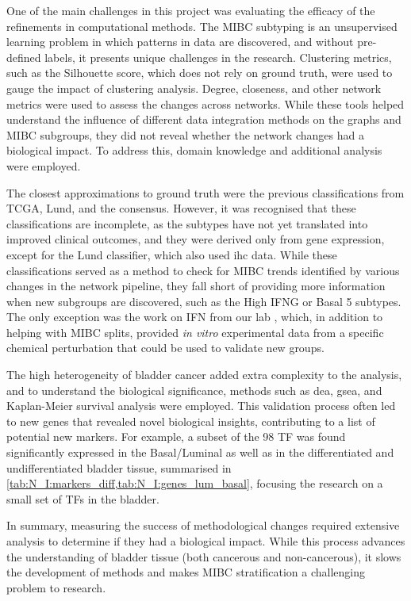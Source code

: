 One of the main challenges in this project was evaluating the efficacy of the refinements in computational methods. The MIBC subtyping is an unsupervised learning problem in which patterns in data are discovered, and without pre-defined labels, it presents unique challenges in the research. Clustering metrics, such as the Silhouette score, which does not rely on ground truth, were used to gauge the impact of clustering analysis. Degree, closeness, and other network metrics were used to assess the changes across networks. While these tools helped understand the influence of different data integration methods on the graphs and MIBC subgroups, they did not reveal whether the network changes had a biological impact. To address this, domain knowledge and additional analysis were employed.

The closest approximations to ground truth were the previous classifications from TCGA, Lund, and the consensus. However, it was recognised that these classifications are incomplete, as the subtypes have not yet translated into improved clinical outcomes, and they were derived only from gene expression, except for the Lund classifier, which also used \acrlong{ihc} data. While these classifications served as a method to check for MIBC trends identified by various changes in the network pipeline, they fall short of providing more information when new subgroups are discovered, such as the High IFNG or Basal 5 subtypes. The only exception was the work on \gls{IFN} from our lab \citep{Baker2022-bj}, which, in addition to helping with MIBC splits, provided \textit{in vitro} experimental data from a specific chemical perturbation that could be used to validate new groups.

The high heterogeneity of bladder cancer added extra complexity to the analysis, and to understand the biological significance, methods such as \acrlong{dea}, \acrlong{gsea}, and Kaplan-Meier survival analysis were employed. This validation process often led to new genes that revealed novel biological insights, contributing to a list of potential new markers. For example, a subset of the 98 TF was found significantly expressed in the Basal/Luminal as well as in the differentiated and undifferentiated bladder tissue, summarised in \cref{tab:N_I:markers_diff,tab:N_I:genes_lum_basal}, focusing the research on a small set of TFs in the bladder.


In summary, measuring the success of methodological changes required extensive analysis to determine if they had a biological impact. While this process advances the understanding of bladder tissue (both cancerous and non-cancerous), it slows the development of methods and makes MIBC stratification a challenging problem to research.

